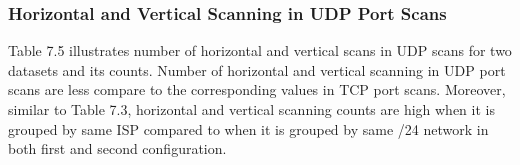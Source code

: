 \subsubsection{Horizontal and Vertical Scanning in UDP Port Scans}
Table 7.5 illustrates number of horizontal and vertical scans in UDP scans for two datasets and its counts. 
Number of horizontal and vertical scanning in UDP port scans are less compare to the corresponding values in TCP port scans.
Moreover, similar to Table 7.3, horizontal and vertical scanning counts are high when it is grouped by same ISP compared to when it is grouped by same /24 network in both first and second configuration.
\begin{table}[t!]
    \centering
    \caption{Number of Horizontal and Vertical scans in UDP Port Scans for Two Datasets and its Counts}
\end{table}
